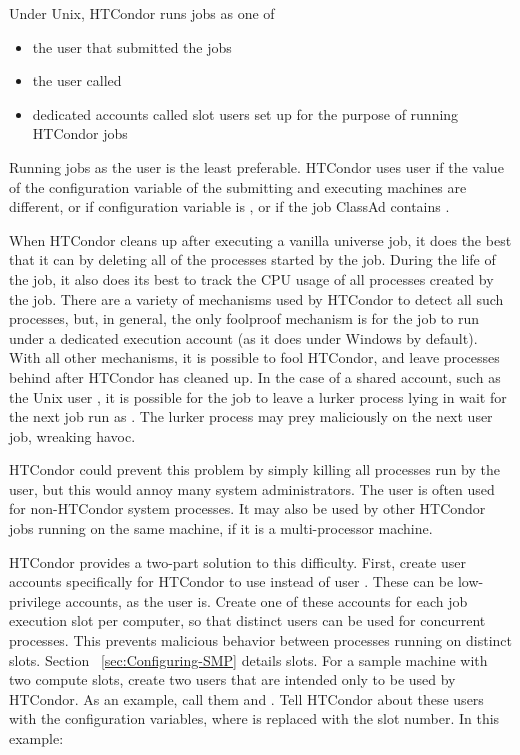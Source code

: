 Under Unix, HTCondor runs jobs as one of
\begin{itemize}
\item the user that submitted the jobs
\item the user called 
\item dedicated accounts called slot users
 set up for the purpose of running HTCondor jobs
\end{itemize}

Running jobs as the  user is the least preferable.
HTCondor uses user
 if the value of the  configuration
variable of the submitting and executing machines are different,
or if configuration variable  
is ,
or if the job ClassAd contains .  

When HTCondor cleans up after executing a vanilla universe job, 
it does the best that it can by deleting all of the processes 
started by the job.  
During the life of the job, it also does its best to track the
CPU usage of all processes created by the job.  There are a variety of
mechanisms used by HTCondor to detect all such processes, but, in
general, the only foolproof mechanism is for the job to run under a
dedicated execution account (as it does under Windows by default).
With all other mechanisms, it is possible to fool HTCondor, and leave
processes behind after HTCondor has cleaned up.  
In the case of a shared account, such as the Unix user , 
it is possible for the
job to leave a lurker process lying in wait for the next job run as
.  The lurker process may prey maliciously on the next
 user job, wreaking havoc.

HTCondor could prevent this problem by simply killing all processes run by
the  user, but this would annoy many system administrators.
The  user is often used for non-HTCondor system processes.
It may also be used by other HTCondor jobs running on the same machine, if
it is a multi-processor machine.

HTCondor provides a two-part solution to this difficulty.
First, create user accounts specifically for HTCondor to use instead
of user .
These can be low-privilege accounts,
as the  user is.
Create one of these accounts for each job execution slot per computer,
so that distinct users can be used for concurrent processes.
This prevents malicious behavior between
processes running on distinct slots.
Section ~\ref{sec:Configuring-SMP} details slots.
For a sample machine with two compute slots,
create two users that are intended only to be used by HTCondor.
As an example, call them  and .
Tell HTCondor about these users
with the  configuration variables,
where  is replaced with the slot number.
In this example:

